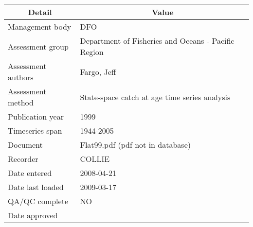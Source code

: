 \begin{table}[htb]
\centering
\begin{tabular}{lp{7cm}}
\toprule
\multicolumn{1}{c}{\textbf{Detail}} & \multicolumn{1}{c}{\textbf{Value}} \\
\midrule
Management body    & DFO                                                 \\
Assessment group   & Department of Fisheries and Oceans - Pacific Region \\
Assessment authors & Fargo, Jeff                                         \\
Assessment method  & State-space catch at age time series analysis       \\
Publication year   & 1999                                                \\
Timeseries span    & 1944-2005                                           \\
Document           & Flat99.pdf (pdf not in database)                    \\
Recorder           & COLLIE                                              \\
Date entered       & 2008-04-21                                          \\
Date last loaded   & 2009-03-17                                          \\
QA/QC complete     & NO                                                  \\
Date approved      &                                                     \\
\bottomrule
\end{tabular}
\label{tab:assessdet}
\end{table}
